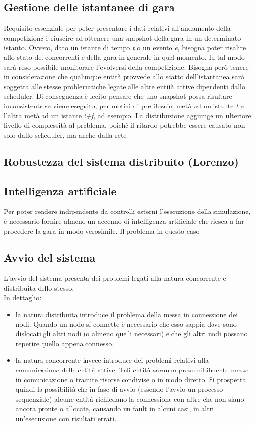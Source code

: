 \subsection{Gestione delle istantanee di gara}
Requisito essenziale per poter presentare i dati relativi all'andamento della competizione è riuscire ad ottenere una
snapshot della gara in un determinato istanto. Ovvero, dato un istante di tempo \emph{t} o un evento \emph{e}, bisogna
poter risalire allo stato dei concorrenti e della gara in generale in quel momento. In tal modo sarà reso possibile
monitorare l'evolversi della competizione. Bisogna però tenere in considerazione che qualunque entità provvede allo scatto
dell'istantanea sarà soggetta alle stesse problematiche legate alle altre entità attive dipendenti dallo scheduler. 
Di conseguenza è lecito pensare che uno snapshot possa risultare inconsistente se viene eseguito, per motivi di 
prerilascio, metà ad un istante
\emph{t} e l'altra metà ad un istante \emph{t+f}, ad esempio. La distribuzione aggiunge un ulteriore livello di complessità
al problema, poichè il ritardo potrebbe essere causato non solo dallo scheduler, ma anche dalla rete.
\subsection{Robustezza del sistema distribuito (Lorenzo)}
\subsection{Intelligenza artificiale}
Per poter rendere indipendente da controlli esterni l'esecuzione della simulazione, è necessario fornire almeno un accenno
di intelligenza artificiale che riesca a far procedere la gara in modo verosimile. Il problema in questo caso
\subsection{Avvio del sistema}
L'avvio del sistema presenta dei problemi legati alla natura concorrente e distribuita dello stesso.\\
In dettaglio:
\begin{itemize}
\item la natura distribuita introduce il problema della messa in connessione dei nodi. Quando un nodo si connette
è necessario che esso sappia dove sono dislocati gli altri nodi (o almeno quelli necessari) e che gli altri nodi
possano reperire quello appena connesso.
\item la natura concorrente invece introduce dei problemi relativi alla comunicazione delle entità attive. Tali entità
saranno presumibilmente messe in comunicazione o tramite risorse condivise o in modo diretto. Si prospetta quindi la
possibilità che in fase di avvio (essendo l'avvio un processo sequenziale) alcune entità richiedano la connessione con 
altre che non siano ancora pronte o allocate, causando un fault in alcuni casi, in altri un'esecuzione con risultati 
errati.
\end{itemize}

